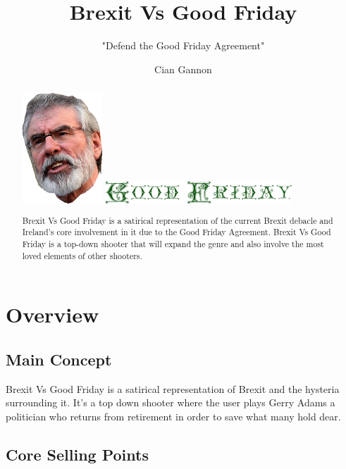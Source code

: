 \documentclass[a4paper]{scrreprt}
\title{Brexit Vs Good Friday}
\subtitle{"Defend the Good Friday Agreement"}
\author{Cian Gannon}
\begin{document}
    \maketitle

    \begin{abstract}

        \centering
        \includegraphics[width=3cm]{gerry-flip}
        \linebreak
        \includegraphics[width=7cm]{good-friday}

        Brexit Vs Good Friday is a satirical representation of the current Brexit debacle and Ireland's core involvement in it due to the Good Friday Agreement. 
        Brexit Vs Good Friday is a top-down shooter that will expand the genre and also involve the most loved elements of other shooters.
        
    \end{abstract}

    \tableofcontents

    \chapter{Overview}

    \section{Main Concept}
    Brexit Vs Good Friday is a satirical representation of Brexit and the hysteria surrounding it. It's a top down shooter where the user plays Gerry Adams a politician who returns from retirement in order to save what many hold dear.
    
    \section{Core Selling Points}
\end{document}
